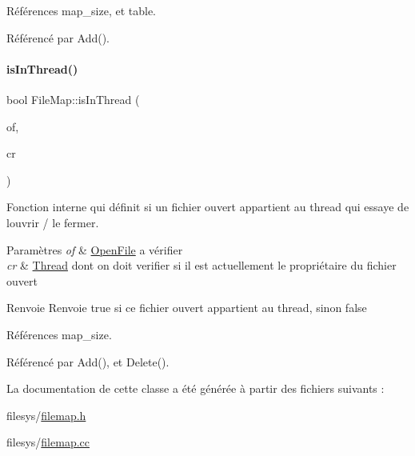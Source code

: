 Références map\+\_\+size, et table.



Référencé par Add().

\hypertarget{class_file_map_abd72d5b1fe0d70f1250bbde70773af20}{}\label{class_file_map_abd72d5b1fe0d70f1250bbde70773af20} 
\paragraph{\texorpdfstring{is\+In\+Thread()}{isInThread()}}
{\footnotesize\ttfamily bool File\+Map\+::is\+In\+Thread (\begin{DoxyParamCaption}\item[{\hyperlink{class_open_file}{Open\+File} $\ast$}]{of,  }\item[{\hyperlink{class_thread}{Thread} $\ast$}]{cr }\end{DoxyParamCaption})\hspace{0.3cm}{\ttfamily [private]}}



Fonction interne qui définit si un fichier ouvert appartient au thread qui essaye de l\textquotesingle{}ouvrir / le fermer. 


\begin{DoxyParams}{Paramètres}
{\em of} & \hyperlink{class_open_file}{Open\+File} a vérifier \\
\hline
{\em cr} & \hyperlink{class_thread}{Thread} dont on doit verifier si il est actuellement le propriétaire du fichier ouvert \\
\hline
\end{DoxyParams}
\begin{DoxyReturn}{Renvoie}
Renvoie true si ce fichier ouvert appartient au thread, sinon false 
\end{DoxyReturn}


Références map\+\_\+size.



Référencé par Add(), et Delete().



La documentation de cette classe a été générée à partir des fichiers suivants \+:\begin{DoxyCompactItemize}
\item 
filesys/\hyperlink{filemap_8h}{filemap.\+h}\item 
filesys/\hyperlink{filemap_8cc}{filemap.\+cc}\end{DoxyCompactItemize}

